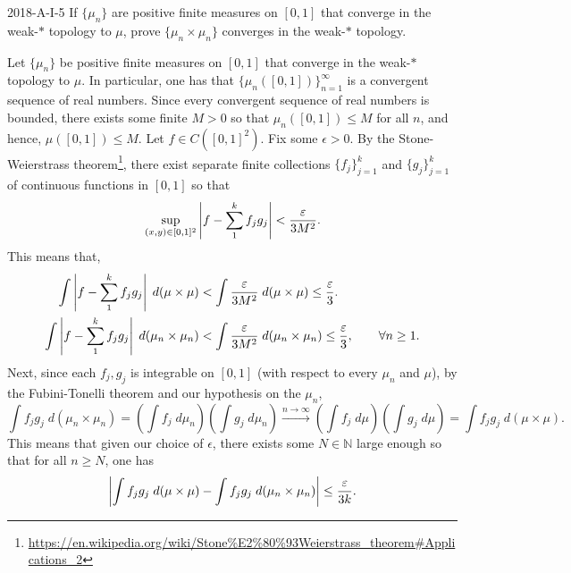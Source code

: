 \documentclass{article}
\begin{document}
	\begin{prb}{2018-A-I-5}
		If $\{\mu_{n}\}$ are positive finite measures on $[0,1]$ that converge in the weak-$\ast$ topology to $\mu$, prove $\{\mu_{n} \times \mu_{n}\}$ converges in the weak-$\ast$ topology. 
	\end{prb}
	Let $\{\mu_{n}\}$ be positive finite measures on $[0,1]$ that converge in the weak-$\ast$ topology to $\mu$. In particular, one has that $\{\mu_{n}([0,1])\}_{n=1}^{\infty}$ is a convergent sequence of real numbers. Since every convergent sequence of real numbers is bounded, there exists some finite $M > 0$ so that $\mu_{n}([0,1]) \leq M$ for all $n$, and hence, $\mu([0,1]) \leq M$. Let $f \in C([0,1]^{2})$. Fix some $\epsilon > 0$. By the Stone-Weierstrass theorem\footnote{\href{https://en.wikipedia.org/wiki/Stone\%E2\%80\%93Weierstrass\_theorem\#Applications\_2}{https://en.wikipedia.org/wiki/Stone\%E2\%80\%93Weierstrass\_theorem\#Applications\_2}}, there exist separate finite collections $\{f_{j}\}_{j = 1}^{k}$ and $\{g_{j}\}_{j = 1}^{k}$ of continuous functions in $[0,1]$ so that 
	\begin{equation*}
		\sup_{(x, y) \in [0,1]^{2}}\left| f - \sum_{1}^{k}f_{j}g_{j} \right| < \frac{\varepsilon}{3M^{2}}. 
	\end{equation*}
	This means that, 
	\begin{align*}
		\begin{split}
			\int \left| f - \sum_{1}^{k}f_{j}g_{j} \right|\;d(\mu \times \mu) &< \int \frac{\varepsilon}{3M^{2}}\;d(\mu\times\mu) \leq \frac{\varepsilon}{3}. \\
			\int \left| f - \sum_{1}^{k}f_{j}g_{j} \right|\;d(\mu_n \times \mu_n) & < \int \frac{\varepsilon}{3M^2}\;d(\mu_n \times \mu_n) \leq \frac{\varepsilon}{3}, \qquad \forall n \geq 1. 
		\end{split}
	\end{align*}
	Next, since each $f_{j}, g_{j}$ is integrable on $[0,1]$ (with respect to every $\mu_n$ and $\mu$), by the Fubini-Tonelli theorem and our hypothesis on the $\mu_{n}$, 
	\begin{equation*}
		\int f_{j}g_{j}\;d(\mu_n \times \mu_n) = \left(\int f_{j}\;d\mu_n\right)\left(\int g_{j}\;d\mu_n\right) \xrightarrow{n \to \infty}\left(\int f_j\;d\mu\right)\left(\int g_j\;d\mu\right) = \int f_jg_j\;d(\mu \times \mu). 
	\end{equation*}
	This means that given our choice of $\epsilon$, there exists some $N \in \mathbb{N}$ large enough so that for all $n\geq N$, one has 
	\begin{equation*}
		\left| \int f_{j}g_j\;d(\mu \times \mu) - \int f_jg_j\;d(\mu_n\times\mu_n) \right| \leq \frac{\varepsilon}{3k}. 
	\end{equation*}
	
\end{document}
